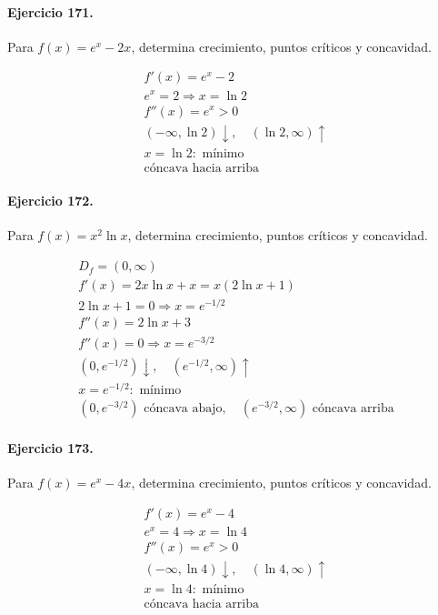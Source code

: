 \documentclass[11pt,a4paper]{article}
\begin{document}
\paragraph{Ejercicio 171.} Para $f(x)=e^x-2x$, determina crecimiento, puntos críticos y concavidad.

\[
\begin{aligned}
f'(x)=e^x-2\\
e^x=2\Rightarrow x=\ln 2\\
f''(x)=e^x>0\\
(-\infty,\ln 2)\downarrow,\quad(\ln 2,\infty)\uparrow\\
x=\ln 2:\text{ mínimo}\\
\text{{cóncava hacia arriba}}
\end{aligned}
\]


\paragraph{Ejercicio 172.} Para $f(x)=x^2\ln x$, determina crecimiento, puntos críticos y concavidad.

\[
\begin{aligned}
D_f=(0,\infty)\\
f'(x)=2x\ln x+x=x(2\ln x+1)\\
2\ln x+1=0\Rightarrow x=e^{-1/2}\\
f''(x)=2\ln x+3\\
f''(x)=0\Rightarrow x=e^{-3/2}\\
(0,e^{-1/2})\downarrow,\quad(e^{-1/2},\infty)\uparrow\\
x=e^{-1/2}:\text{{ mínimo}}\\
(0,e^{-3/2})\text{{ cóncava abajo}},\quad(e^{-3/2},\infty)\text{{ cóncava arriba}}
\end{aligned}
\]


\paragraph{Ejercicio 173.} Para $f(x)=e^x-4x$, determina crecimiento, puntos críticos y concavidad.

\[
\begin{aligned}
f'(x)=e^x-4\\
e^x=4\Rightarrow x=\ln 4\\
f''(x)=e^x>0\\
(-\infty,\ln 4)\downarrow,\quad(\ln 4,\infty)\uparrow\\
x=\ln 4:\text{ mínimo}\\
\text{{cóncava hacia arriba}}
\end{aligned}
\]
\end{document}

